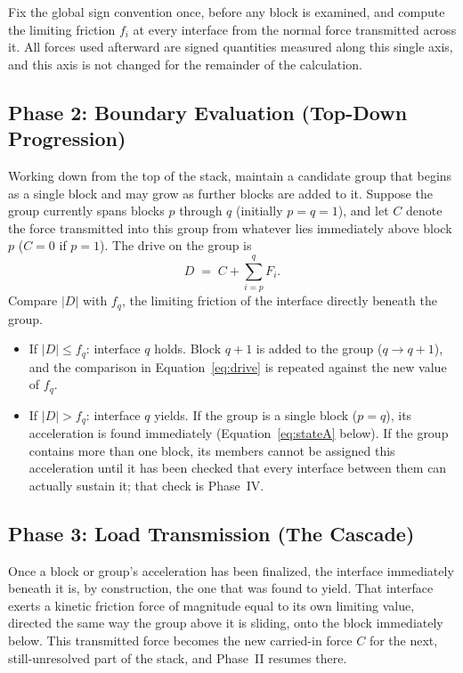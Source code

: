 \documentclass[11pt,a4paper]{article}
\begin{document}
Fix the global sign convention once, before any block is examined, and compute the limiting friction $f_i$ at every interface from the normal force transmitted across it. All forces used afterward are signed quantities measured along this single axis, and this axis is not changed for the remainder of the calculation.

\subsection{Phase 2: Boundary Evaluation (Top-Down Progression)}

Working down from the top of the stack, maintain a candidate group that begins as a single block and may grow as further blocks are added to it. Suppose the group currently spans blocks $p$ through $q$ (initially $p = q = 1$), and let $C$ denote the force transmitted into this group from whatever lies immediately above block $p$ ($C = 0$ if $p = 1$). The drive on the group is
\begin{equation}
D \;=\; C + \sum_{i=p}^{q} F_i .
\label{eq:drive}
\end{equation}
Compare $|D|$ with $f_q$, the limiting friction of the interface directly beneath the group.
\begin{itemize}[leftmargin=1.4em]
\item If $|D| \le f_q$: interface $q$ holds. Block $q+1$ is added to the group ($q \to q+1$), and the comparison in Equation~\eqref{eq:drive} is repeated against the new value of $f_q$.
\item If $|D| > f_q$: interface $q$ yields. If the group is a single block ($p=q$), its acceleration is found immediately (Equation~\eqref{eq:stateA} below). If the group contains more than one block, its members cannot be assigned this acceleration until it has been checked that every interface between them can actually sustain it; that check is Phase~IV.
\end{itemize}

\subsection{Phase 3: Load Transmission (The Cascade)}

Once a block or group's acceleration has been finalized, the interface immediately beneath it is, by construction, the one that was found to yield. That interface exerts a kinetic friction force of magnitude equal to its own limiting value, directed the same way the group above it is sliding, onto the block immediately below. This transmitted force becomes the new carried-in force $C$ for the next, still-unresolved part of the stack, and Phase~II resumes there.
\end{document}

